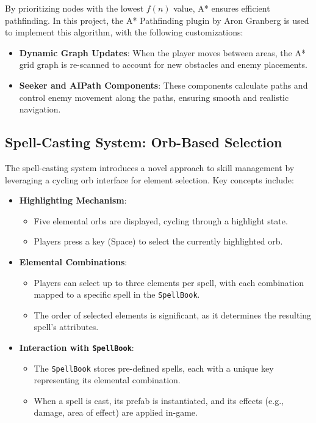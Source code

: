 \documentclass[10pt,twocolumn]{article}
\begin{document}
By prioritizing nodes with the lowest \(f(n)\) value, A* ensures efficient pathfinding. In this project, the A* Pathfinding plugin by Aron Granberg is used to implement this algorithm, with the following customizations:
\begin{itemize}
    \item \textbf{Dynamic Graph Updates}: When the player moves between areas, the A* grid graph is re-scanned to account for new obstacles and enemy placements.
    \item \textbf{Seeker and AIPath Components}: These components calculate paths and control enemy movement along the paths, ensuring smooth and realistic navigation.
\end{itemize}

\subsection{Spell-Casting System: Orb-Based Selection}
The spell-casting system introduces a novel approach to skill management by leveraging a cycling orb interface for element selection. Key concepts include:
\begin{itemize}
    \item \textbf{Highlighting Mechanism}:
        \begin{itemize}
            \item Five elemental orbs are displayed, cycling through a highlight state.
            \item Players press a key (Space) to select the currently highlighted orb.
        \end{itemize}
    \item \textbf{Elemental Combinations}:
        \begin{itemize}
            \item Players can select up to three elements per spell, with each combination mapped to a specific spell in the \texttt{SpellBook}.
            \item The order of selected elements is significant, as it determines the resulting spell's attributes.
        \end{itemize}
    \item \textbf{Interaction with \texttt{SpellBook}}:
        \begin{itemize}
            \item The \texttt{SpellBook} stores pre-defined spells, each with a unique key representing its elemental combination.
            \item When a spell is cast, its prefab is instantiated, and its effects (e.g., damage, area of effect) are applied in-game.
        \end{itemize}
\end{itemize}
\end{document}
